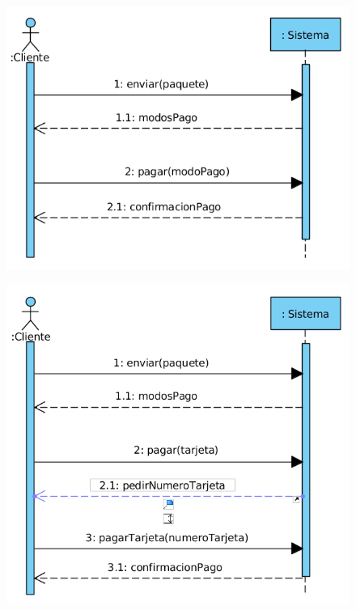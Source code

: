 \begin{figure}[H]
	\centering
	\includegraphics[width=16cm]{42}
\end{figure}
\begin{figure}[H]
	\centering
	\includegraphics[width=16cm]{43}
\end{figure}
